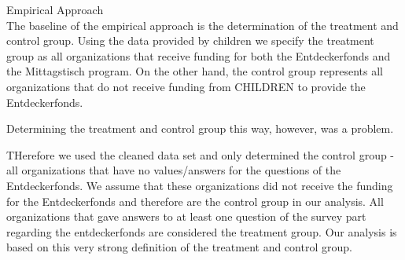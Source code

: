 \documentclass[12pt, a4paper, titlepage]{article}\usepackage[]{graphicx}\usepackage[]{color}
\makeatletter
\newenvironment{kframe}{%
 \def\at@end@of@kframe{}%
 \ifinner\ifhmode%
  \def\at@end@of@kframe{\end{minipage}}%
  \begin{minipage}{\columnwidth}%
 \fi\fi%
 \def\FrameCommand##1{\hskip\@totalleftmargin \hskip-\fboxsep
 \colorbox{shadecolor}{##1}\hskip-\fboxsep
     \hskip-\linewidth \hskip-\@totalleftmargin \hskip\columnwidth}%
 \MakeFramed {\advance\hsize-\width
   \@totalleftmargin\z@ \linewidth\hsize
   \@setminipage}}%
 {\par\unskip\endMakeFramed%
 \at@end@of@kframe}
\makeatother
\begin{document}
\begin{kframe}
\begin{kframe}
{\ttfamily\noindent{}}

{\ttfamily\noindent\bfseries{}}

{\ttfamily\noindent\bfseries{}}\end{kframe}

\begin{kframe}


{\ttfamily\noindent{}}

{\ttfamily\noindent\bfseries{}}

{\ttfamily\noindent\bfseries{}}\end{kframe}

{\ttfamily\noindent\bfseries\color{errorcolor}{\#\# Error in l[[i]]: subscript out of bounds}}\end{kframe}





Empirical Approach\\

The baseline of the empirical approach is the determination of the treatment and control group. Using the data provided by children we specify the treatment group as all organizations that receive funding for both the Entdeckerfonds and the Mittagstisch program. On the other hand, the control group represents all organizations that do not receive funding from CHILDREN to provide the Entdeckerfonds.

Determining the treatment and control group this way, however, was a problem.

THerefore we used the cleaned data set and only determined the control group - all organizations that have no values/answers for the questions of the Entdeckerfonds. We assume that these organizations did not receive the funding for the Entdeckerfonds and therefore are the control group in our analysis. All organizations that gave answers to at least one question of the survey part regarding the entdeckerfonds are considered the treatment group. 
Our analysis is based on this very strong definition of the treatment and control group.
\end{document}
